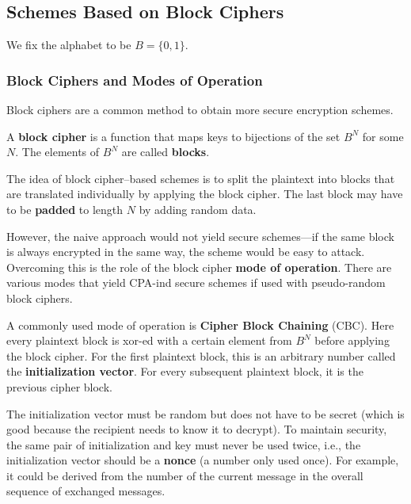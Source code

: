 \subsection{Schemes Based on Block Ciphers}

We fix the alphabet to be $B=\{0,1\}$.

\subsubsection{Block Ciphers and Modes of Operation}

Block ciphers are a common method to obtain more secure encryption schemes.

A \textbf{block cipher} is a function that maps keys to bijections of the set $B^N$ for some $N$.
The elements of $B^N$ are called \textbf{blocks}.

The idea of block cipher--based schemes is to split the plaintext into blocks that are translated individually by applying the block cipher.
The last block may have to be \textbf{padded} to length $N$ by adding random data.

However, the naive approach would not yield secure schemes---if the same block is always encrypted in the same way, the scheme would be easy to attack.
Overcoming this is the role of the block cipher \textbf{mode of operation}.
There are various modes that yield CPA-ind secure schemes if used with pseudo-random block ciphers.

A commonly used mode of operation is \textbf{Cipher Block Chaining} (CBC).
Here every plaintext block is xor-ed with a certain element from $B^N$ before applying the block cipher.
For the first plaintext block, this is an arbitrary number called the \textbf{initialization vector}.
For every subsequent plaintext block, it is the previous cipher block.

The initialization vector must be random but does not have to be secret (which is good because the recipient needs to know it to decrypt).
To maintain security, the same pair of initialization and key must never be used twice, i.e., the initialization vector should be a \textbf{nonce} (a number only used once).
For example, it could be derived from the number of the current message in the overall sequence of exchanged messages.

